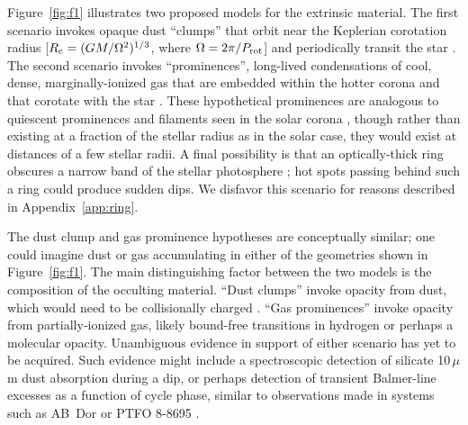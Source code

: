 \documentclass[11pt,twocolumn,tighten]{aastex63}
\begin{document}
Figure~\ref{fig:f1} illustrates two proposed models for the extrinsic
material.  The first scenario invokes opaque dust ``clumps'' that
orbit near the Keplerian corotation radius [$R_{\rm c} =
(GM/\Omega^2)^{1/3}$, where $\Omega = 2\pi/P_{\rm rot}$] and
periodically transit the star
\citep[e.g.][]{2017AJ....153..152S,2017MNRAS.471L.145F,2023MNRAS.518.4734S}.  The second scenario
invokes ``prominences'', long-lived condensations of cool, dense,
marginally-ionized gas that are embedded within the hotter corona and
that corotate with the star
\citep{1989MNRAS.238..657C,2019MNRAS.482.2853J,2022MNRAS.514.5465W}.
These hypothetical prominences are analogous to quiescent prominences
and filaments seen in the solar corona \citep[see
e.g.][]{2015ASSL..415.....V}, though rather than existing at a
fraction of the stellar radius as in the solar case, they would exist
at distances of a few stellar radii.  A final possibility is that an
optically-thick ring obscures a narrow band of the stellar
photosphere \citep{2019ApJ...876..127Z}; hot spots passing behind
such a ring could produce sudden dips.  We disfavor this scenario
for reasons described in Appendix~\ref{app:ring}.

The dust clump and gas prominence hypotheses are conceptually
similar; one could imagine dust or gas accumulating in
either of the geometries shown in Figure~\ref{fig:f1}.  The main
distinguishing factor between the two models is the composition of the
occulting material.   ``Dust clumps'' invoke opacity from dust, which
would need to be collisionally charged \citep{2023MNRAS.518.4734S}.
``Gas prominences'' invoke opacity from partially-ionized gas, likely
bound-free transitions in hydrogen or perhaps a molecular opacity.
Unambiguous evidence in support of either scenario has yet to be
acquired.  Such evidence might include a spectroscopic detection of
silicate 10\,$\mu$m dust absorption during a dip, or perhaps detection
of transient Balmer-line excesses as a function of cycle phase,
similar to observations made in systems such as AB~Dor
\citep[see][]{1999ASPC..158..146C} or PTFO 8-8695
\citep{2016ApJ...830...15J}.
\end{document}
